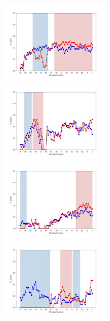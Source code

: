 \documentclass[11pt]{jreport}
\begin{document}
\begin{figure}[H]
\begin{minipage}{\textwidth}
\vspace{0.08\textheight}
\begin{center}
    \includegraphics[width=0.495\textwidth]{Uenaka_fig/RQ1_result/Nova_merge_F1.pdf}
    \includegraphics[width=0.495\textwidth]{Uenaka_fig/RQ1_result/Neutron_merge_F1.pdf}
    \includegraphics[width=0.495\textwidth]{Uenaka_fig/RQ1_result/Cinder_merge_F1.pdf}
    \includegraphics[width=0.495\textwidth]{Uenaka_fig/RQ1_result/Keystone_merge_F1.pdf}

\end{center}
\end{minipage}
\end{figure}
\end{document}
